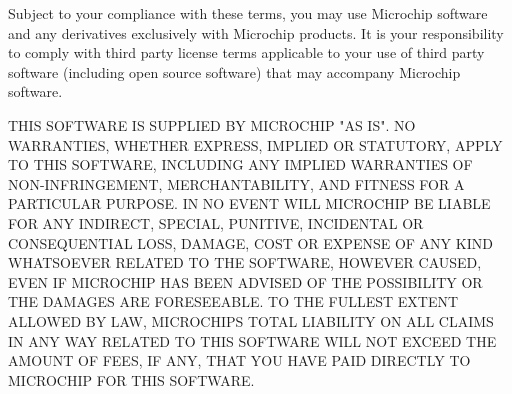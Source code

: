 Subject to your compliance with these terms, you may use Microchip software and any derivatives exclusively with Microchip products. It is your responsibility to comply with third party license terms applicable to your use of third party software (including open source software) that may accompany Microchip software.

THIS SOFTWARE IS SUPPLIED BY MICROCHIP "{}\+AS IS"{}. NO WARRANTIES, WHETHER EXPRESS, IMPLIED OR STATUTORY, APPLY TO THIS SOFTWARE, INCLUDING ANY IMPLIED WARRANTIES OF NON-\/\+INFRINGEMENT, MERCHANTABILITY, AND FITNESS FOR A PARTICULAR PURPOSE. IN NO EVENT WILL MICROCHIP BE LIABLE FOR ANY INDIRECT, SPECIAL, PUNITIVE, INCIDENTAL OR CONSEQUENTIAL LOSS, DAMAGE, COST OR EXPENSE OF ANY KIND WHATSOEVER RELATED TO THE SOFTWARE, HOWEVER CAUSED, EVEN IF MICROCHIP HAS BEEN ADVISED OF THE POSSIBILITY OR THE DAMAGES ARE FORESEEABLE. TO THE FULLEST EXTENT ALLOWED BY LAW, MICROCHIP\textquotesingle{}S TOTAL LIABILITY ON ALL CLAIMS IN ANY WAY RELATED TO THIS SOFTWARE WILL NOT EXCEED THE AMOUNT OF FEES, IF ANY, THAT YOU HAVE PAID DIRECTLY TO MICROCHIP FOR THIS SOFTWARE. 